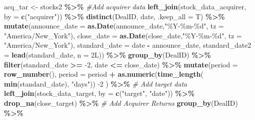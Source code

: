 \documentclass[
]{article}
\newenvironment{Shaded}{\begin{snugshade}}{\end{snugshade}}
\newcommand{\CommentTok}[1]{\textcolor[rgb]{0.56,0.35,0.01}{\textit{#1}}}
\newcommand{\DataTypeTok}[1]{\textcolor[rgb]{0.13,0.29,0.53}{#1}}
\newcommand{\DecValTok}[1]{\textcolor[rgb]{0.00,0.00,0.81}{#1}}
\newcommand{\KeywordTok}[1]{\textcolor[rgb]{0.13,0.29,0.53}{\textbf{#1}}}
\newcommand{\NormalTok}[1]{#1}
\newcommand{\OperatorTok}[1]{\textcolor[rgb]{0.81,0.36,0.00}{\textbf{#1}}}
\newcommand{\StringTok}[1]{\textcolor[rgb]{0.31,0.60,0.02}{#1}}
\begin{document}
\begin{Shaded}
\begin{Highlighting}[]
\NormalTok{acq\_tar \textless{}{-}}\StringTok{ }\NormalTok{stocks2 }\OperatorTok{\%\textgreater{}\%}
\StringTok{  }
\StringTok{  }\CommentTok{\#Add acquirer data}
\StringTok{  }\KeywordTok{left\_join}\NormalTok{(stock\_data\_acquirer, }\DataTypeTok{by =} \KeywordTok{c}\NormalTok{(}\StringTok{"acquirer"}\NormalTok{)) }\OperatorTok{\%\textgreater{}\%}
\StringTok{  }\KeywordTok{distinct}\NormalTok{(DealID, date, }\DataTypeTok{.keep\_all =}\NormalTok{ T) }\OperatorTok{\%\textgreater{}\%}\StringTok{ }
\StringTok{  }\KeywordTok{mutate}\NormalTok{(}\DataTypeTok{announce\_date =} \KeywordTok{as.Date}\NormalTok{(announce\_date,}\StringTok{"\%Y{-}\%m{-}\%d"}\NormalTok{, }\DataTypeTok{tz =} \StringTok{"America/New\_York"}\NormalTok{),}
         \DataTypeTok{close\_date =} \KeywordTok{as.Date}\NormalTok{(close\_date,}\StringTok{"\%Y{-}\%m{-}\%d"}\NormalTok{, }\DataTypeTok{tz =} \StringTok{"America/New\_York"}\NormalTok{),}
         \DataTypeTok{standard\_date =}\NormalTok{ date }\OperatorTok{{-}}\StringTok{ }\NormalTok{announce\_date,}
         \DataTypeTok{standard\_date2 =} \KeywordTok{lead}\NormalTok{(standard\_date, }\DataTypeTok{n =}\NormalTok{ 2L)) }\OperatorTok{\%\textgreater{}\%}\StringTok{ }
\StringTok{  }\KeywordTok{group\_by}\NormalTok{(DealID) }\OperatorTok{\%\textgreater{}\%}\StringTok{ }
\StringTok{  }\KeywordTok{filter}\NormalTok{(standard\_date }\OperatorTok{\textgreater{}=}\StringTok{ }\DecValTok{{-}2}\NormalTok{,}
\NormalTok{         date }\OperatorTok{\textless{}=}\StringTok{ }\NormalTok{close\_date) }\OperatorTok{\%\textgreater{}\%}\StringTok{ }
\StringTok{  }\KeywordTok{mutate}\NormalTok{(}\DataTypeTok{period =} \KeywordTok{row\_number}\NormalTok{(),}
         \DataTypeTok{period =}\NormalTok{ period }\OperatorTok{+}\StringTok{ }\KeywordTok{as.numeric}\NormalTok{(}\KeywordTok{time\_length}\NormalTok{( }\KeywordTok{min}\NormalTok{(standard\_date), }\StringTok{"days"}\NormalTok{)) }\DecValTok{{-}2}\NormalTok{ ) }\OperatorTok{\%\textgreater{}\%}\StringTok{ }
\StringTok{ }
\StringTok{  }\CommentTok{\# Add target data}
\StringTok{  }\KeywordTok{left\_join}\NormalTok{(stock\_data\_target, }\DataTypeTok{by =} \KeywordTok{c}\NormalTok{(}\StringTok{"target"}\NormalTok{, }\StringTok{"date"}\NormalTok{)) }\OperatorTok{\%\textgreater{}\%}
\StringTok{  }\KeywordTok{drop\_na}\NormalTok{(close\_target) }\OperatorTok{\%\textgreater{}\%}
\StringTok{  }
\StringTok{  }\CommentTok{\# Add Acquirer Returns}
\StringTok{  }\KeywordTok{group\_by}\NormalTok{(DealID) }\OperatorTok{\%\textgreater{}\%}

\end{Highlighting}
\end{Shaded}
\end{document}
